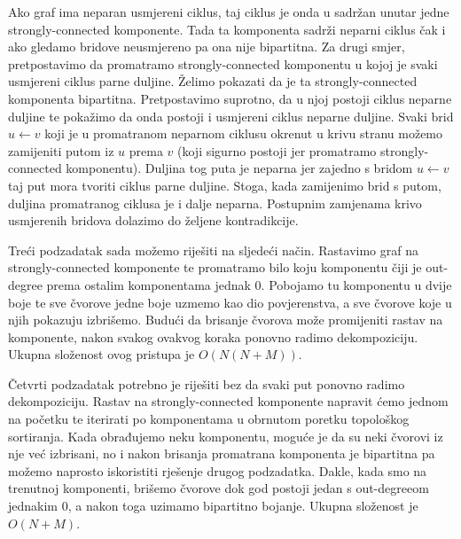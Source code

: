 Ako graf ima neparan usmjereni ciklus, taj ciklus je onda u sadržan unutar jedne strongly-connected komponente. Tada ta komponenta sadrži neparni ciklus čak i ako gledamo bridove neusmjereno pa ona nije bipartitna. Za drugi smjer, pretpostavimo da promatramo strongly-connected komponentu u kojoj je svaki usmjereni ciklus parne duljine. Želimo pokazati da je ta strongly-connected komponenta bipartitna. Pretpostavimo suprotno, da u njoj postoji ciklus neparne duljine te pokažimo da onda postoji i usmjereni ciklus neparne duljine. Svaki brid $u \leftarrow v$ koji je u promatranom neparnom ciklusu okrenut u krivu stranu možemo zamijeniti putom iz $u$ prema $v$ (koji sigurno postoji jer promatramo strongly-connected komponentu). Duljina tog puta je neparna jer zajedno s bridom $u \leftarrow v$ taj put mora tvoriti ciklus parne duljine. Stoga, kada zamijenimo brid s putom, duljina promatranog ciklusa je i dalje neparna. Postupnim zamjenama krivo usmjerenih bridova dolazimo do željene kontradikcije.

Treći podzadatak sada možemo riješiti na sljedeći način. Rastavimo graf na strongly-connected komponente te promatramo bilo koju komponentu čiji je out-degree prema ostalim komponentama jednak 0. Pobojamo tu komponentu u dvije boje te sve čvorove jedne boje uzmemo kao dio povjerenstva, a sve čvorove koje u njih pokazuju izbrišemo. Budući da brisanje čvorova može promijeniti rastav na komponente, nakon svakog ovakvog koraka ponovno radimo dekompoziciju. Ukupna složenost ovog pristupa je $O(N(N + M))$.

Četvrti podzadatak potrebno je riješiti bez da svaki put ponovno radimo dekompoziciju. Rastav na strongly-connected komponente napravit ćemo jednom na početku te iterirati po komponentama u obrnutom poretku topološkog sortiranja. Kada obrađujemo neku komponentu, moguće je da su neki čvorovi iz nje već izbrisani, no i nakon brisanja promatrana komponenta je bipartitna pa možemo naprosto iskoristiti rješenje drugog podzadatka. Dakle, kada smo na trenutnoj komponenti, brišemo čvorove dok god postoji jedan s out-degreeom jednakim 0, a nakon toga uzimamo bipartitno bojanje. Ukupna složenost je $O(N + M)$.
